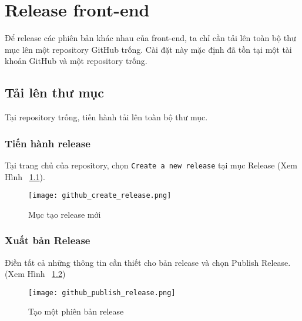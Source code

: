 \chapter{Release front-end}
\label{Chapter3}

Để release các phiên bản khác nhau của front-end, ta chỉ cần tải lên toàn bộ thư mục lên một repository GitHub trống. Cài đặt này mặc định đã tồn tại một tài khoản GitHub và một repository trống.

\section{Tải lên thư mục}
Tại repository trống, tiến hành tải lên toàn bộ thư mục.

\subsection{Tiến hành release}
Tại trang chủ của repository, chọn \texttt{Create a new release} tại mục Release (Xem Hình ~\ref{fig:github_create_release}).
\begin{figure}
    \centering
    \texttt{[image: github\_create\_release.png]}
    \caption{Mục tạo release mới}
    \label{fig:github_create_release}
\end{figure}

\subsection{Xuất bản Release}
Điền tất cả những thông tin cần thiết cho bản release và chọn Publish Release. (Xem Hình ~\ref{fig:github_publish_release})
\begin{figure}
    \centering
    \texttt{[image: github\_publish\_release.png]}
    \caption{Tạo một phiên  bản release}
    \label{fig:github_publish_release}
\end{figure}